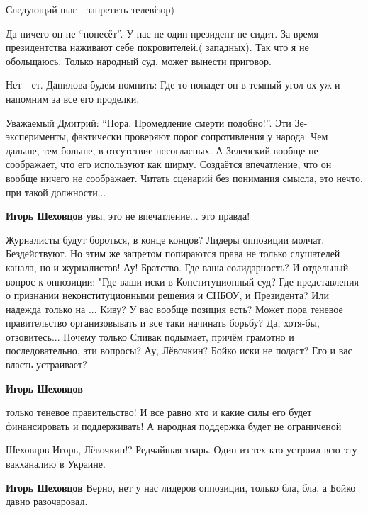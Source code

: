 \begin{itemize}

Следующий шаг - запретить телевізор)


Да ничего он не \enquote{понесёт}. У нас не один президент не сидит. За время
президентства наживают себе покровителей.( западных). Так что я не обольщаюсь.
Только народный суд, может вынести приговор.


Нет - ет. Данилова будем помнить: Где то попадет он в темный угол ох уж и
напомним за все его проделки.


Уважаемый Дмитрий: \enquote{Пора. Промедление смерти подобно!}. Эти Зе-эксперименты,
фактически проверяют порог сопротивления у народа. Чем дальше, тем больше, в
отсутствие несогласных. А Зеленский вообще не соображает, что его используют как
ширму. Создаётся впечатление, что он вообще ничего не соображает. Читать
сценарий без понимания смысла, это нечто, при такой должности...

\textbf{Игорь Шеховцов} увы, это не впечатление... это правда!


Журналисты будут бороться, в конце концов? Лидеры оппозиции молчат.
Бездействуют. Но этим же запретом попираются права не только слушателей
канала, но и журналистов! Ау! Братство. Где ваша солидарность? И отдельный вопрос
к оппозиции: "Где ваши иски в Конституционный суд? Где представления о
признании неконституционными решения и СНБОУ, и Президента? Или надежда только
на ... Киву? У вас вообще позиция есть? Может пора теневое правительство
организовывать и все таки начинать борьбу? Да, хотя-бы, отзовитесь... Почему
только Спивак подымает, причём грамотно и последовательно, эти вопросы?
Ау, Лёвочкин? Бойко иски не подаст? Его и вас власть устраивает?

\begin{itemize} %
\textbf{Игорь Шеховцов} 

только теневое правительство! И все равно кто и какие силы его будет
финансировать и поддерживать! А народная поддержка будет не ограниченой


Шеховцов Игорь, Лёвочкин!? Редчайшая тварь. Один из тех кто устроил всю эту
вакханалию в Украине.


\textbf{Игорь Шеховцов} Верно, нет у нас лидеров оппозиции, только бла, бла, а Бойко давно разочаровал.
\end{itemize} %


\end{itemize}

